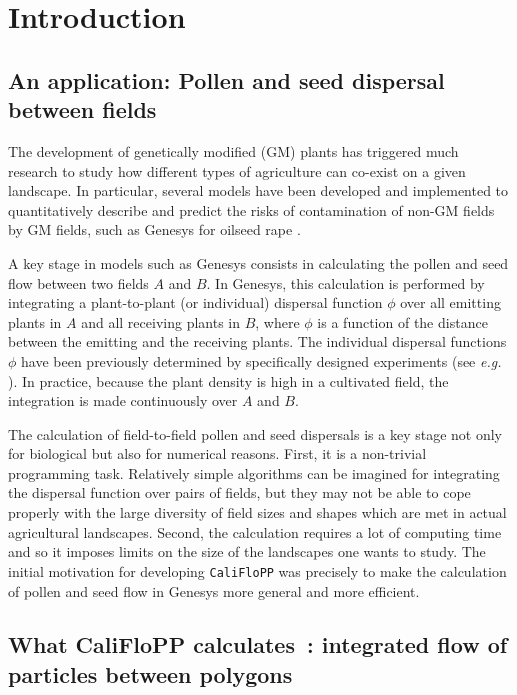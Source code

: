 \chapter{Introduction}
\label{introduction}
\section{An application: Pollen and seed dispersal between fields}
The development of genetically modified (GM) plants has triggered much
research to study how different types of agriculture can co-exist on a
given landscape. In particular, several models have been developed and
implemented to quantitatively describe and predict the risks of
contamination of non-GM fields by GM fields, such as Genesys for oilseed
rape \cite{Colbach1:2001,Colbach2:2001}.

A key stage in models such as Genesys consists in calculating the pollen
and seed flow between two fields $A$ and $B$. In Genesys, this
calculation is performed by integrating a plant-to-plant (or individual)
dispersal function $\phi$ over all emitting plants in $A$ and all
receiving plants in $B$, where $\phi$ is a function of the
distance between the emitting and the receiving plants. The individual
dispersal functions $\phi$ have been previously determined by
specifically designed experiments (see \emph{e.g.} \cite{lavigne:1998}).
In practice, because the plant density is high in a cultivated field,
the integration is made continuously over $A$ and $B$.

The calculation of field-to-field pollen and seed dispersals is a key
stage not only for biological but also for numerical reasons. First, it
is a non-trivial programming task. Relatively simple algorithms can be
imagined for integrating the dispersal function over pairs of fields,
but they may not be able to cope properly with the large diversity of
field sizes and shapes which are met in actual agricultural landscapes.
Second, the calculation requires a lot of computing time and so it
imposes limits on the size of the landscapes one wants to study. The
initial motivation for developing \verb+CaliFloPP+ was precisely to make the
calculation of pollen and seed flow in Genesys more general and more
efficient.

\section{What CaliFloPP calculates~: integrated flow of particles between polygons} 

